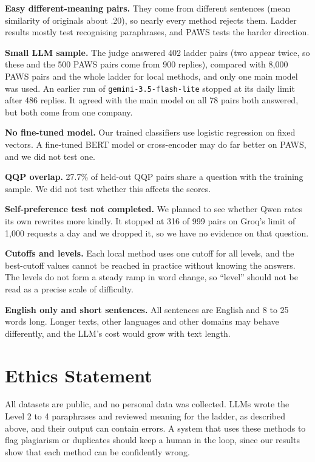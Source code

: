 \documentclass[11pt]{article}
\begin{document}
\textbf{Easy different-meaning pairs.} They come from different sentences (mean similarity of originals about .20), so nearly every method rejects them. Ladder results mostly test recognising paraphrases, and PAWS tests the harder direction.

\textbf{Small LLM sample.} The judge answered 402 ladder pairs (two appear twice, so these and the 500 PAWS pairs come from 900 replies), compared with 8,000 PAWS pairs and the whole ladder for local methods, and only one main model was used. An earlier run of \texttt{gemini-3.5-flash-lite} stopped at its daily limit after 486 replies. It agreed with the main model on all 78 pairs both answered, but both come from one company.

\textbf{No fine-tuned model.} Our trained classifiers use logistic regression on fixed vectors. A fine-tuned BERT model or cross-encoder may do far better on PAWS, and we did not test one.

\textbf{QQP overlap.} 27.7\% of held-out QQP pairs share a question with the training sample. We did not test whether this affects the scores.

\textbf{Self-preference test not completed.} We planned to see whether Qwen rates its own rewrites more kindly. It stopped at 316 of 999 pairs on Groq's limit of 1,000 requests a day and we dropped it, so we have no evidence on that question.

\textbf{Cutoffs and levels.} Each local method uses one cutoff for all levels, and the best-cutoff values cannot be reached in practice without knowing the answers. The levels do not form a steady ramp in word change, so “level” should not be read as a precise scale of difficulty.

\textbf{English only and short sentences.} All sentences are English and 8 to 25 words long. Longer texts, other languages and other domains may behave differently, and the LLM's cost would grow with text length.

\section*{Ethics Statement}
All datasets are public, and no personal data was collected. LLMs wrote the Level 2 to 4 paraphrases and reviewed meaning for the ladder, as described above, and their output can contain errors. A system that uses these methods to flag plagiarism or duplicates should keep a human in the loop, since our results show that each method can be confidently wrong.
\end{document}

